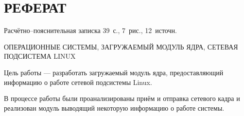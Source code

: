 \chapter*{РЕФЕРАТ}

Расчётно--пояснительная записка 39~с., 7~рис., 12~источн.

\noindent\MakeUppercase{операционные системы, загружаемый модуль ядра, сетевая подсистема Linux}

Цель работы --- разработать загружаемый модуль ядра, предоставляющий информацию о работе сетевой подсистемы Linux.

В процессе работы были проанализированы приём и отправка сетевого кадра и реализован модуль выводящий некоторую информацию о работе системы.

\setcounter{page}{3}